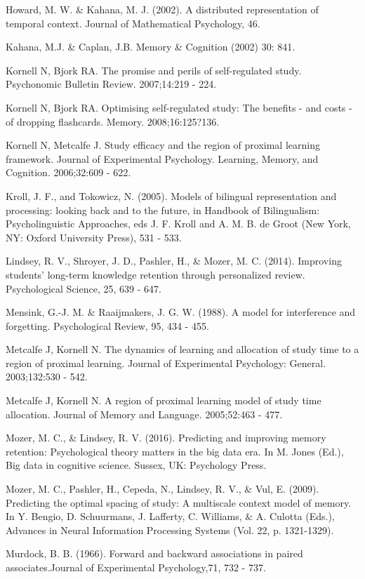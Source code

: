 \documentclass[a4paper,12pt]{article}
\begin{document}
\begin{hangparas}{.25in}{1}
Howard, M. W. \& Kahana, M. J. (2002). A distributed representation of temporal context. Journal of Mathematical Psychology, 46.

Kahana, M.J. \& Caplan, J.B. Memory \& Cognition (2002) 30: 841.

Kornell N, Bjork RA. The promise and perils of self-regulated study. Psychonomic Bulletin Review. 2007;14:219 - 224.

Kornell N, Bjork RA. Optimising self-regulated study: The benefits - and costs - of dropping flashcards. Memory. 2008;16:125?136. 

Kornell N, Metcalfe J. Study efficacy and the region of proximal learning framework. Journal of Experimental Psychology. Learning, Memory, and Cognition. 2006;32:609 - 622.

Kroll, J. F., and Tokowicz, N. (2005). Models of bilingual representation and
processing: looking back and to the future, in Handbook of Bilingualism:
Psycholinguistic Approaches, eds J. F. Kroll and A. M. B. de Groot (New York,
NY: Oxford University Press), 531 - 533.

Lindsey, R. V., Shroyer, J. D., Pashler, H., \& Mozer, M. C. (2014). Improving students' long-term knowledge retention through personalized review. Psychological Science, 25, 639 - 647.

Mensink, G.-J. M. \& Raaijmakers, J. G. W. (1988). A model for interference and forgetting. Psychological Review, 95, 434 - 455.

Metcalfe J, Kornell N. The dynamics of learning and allocation of study time to a region of proximal learning. Journal of Experimental Psychology: General. 2003;132:530 - 542. 

Metcalfe J, Kornell N. A region of proximal learning model of study time allocation. Journal of Memory and Language. 2005;52:463 - 477. 

Mozer, M. C., \& Lindsey, R. V. (2016). Predicting and improving memory retention: Psychological theory matters in the big data era. In M. Jones (Ed.), Big data in cognitive science. Sussex, UK: Psychology Press.

Mozer, M. C., Pashler, H., Cepeda, N., Lindsey, R. V., \& Vul, E. (2009). Predicting the optimal spacing of study: A multiscale context model of memory. In Y. Bengio, D. Schuurmans, J. Lafferty, C. Williams, \& A. Culotta (Eds.), Advances in Neural Information Processing Systems (Vol. 22, p. 1321-1329).

Murdock, B. B. (1966). Forward and backward associations in paired associates.Journal of Experimental Psychology,71, 732 - 737.


\end{hangparas}
\end{document}
